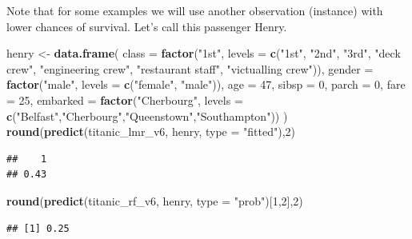 \documentclass[12pt,]{krantz}
\newenvironment{Shaded}{\begin{snugshade}}{\end{snugshade}}
\newcommand{\DataTypeTok}[1]{\textcolor[rgb]{0.13,0.29,0.53}{#1}}
\newcommand{\DecValTok}[1]{\textcolor[rgb]{0.00,0.00,0.81}{#1}}
\newcommand{\KeywordTok}[1]{\textcolor[rgb]{0.13,0.29,0.53}{\textbf{#1}}}
\newcommand{\NormalTok}[1]{#1}
\newcommand{\StringTok}[1]{\textcolor[rgb]{0.31,0.60,0.02}{#1}}
\theoremstyle{definition}
\theoremstyle{definition}
\theoremstyle{definition}
\theoremstyle{remark}
\begin{document}
Note that for some examples we will use another observation (instance)
with lower chances of survival. Let's call this passenger Henry.

\begin{Shaded}
\begin{Highlighting}[]
\NormalTok{henry <-}\StringTok{ }\KeywordTok{data.frame}\NormalTok{(}
            \DataTypeTok{class =} \KeywordTok{factor}\NormalTok{(}\StringTok{"1st"}\NormalTok{, }\DataTypeTok{levels =} \KeywordTok{c}\NormalTok{(}\StringTok{"1st"}\NormalTok{, }\StringTok{"2nd"}\NormalTok{, }\StringTok{"3rd"}\NormalTok{, }\StringTok{"deck crew"}\NormalTok{, }\StringTok{"engineering crew"}\NormalTok{, }\StringTok{"restaurant staff"}\NormalTok{, }\StringTok{"victualling crew"}\NormalTok{)),}
            \DataTypeTok{gender =} \KeywordTok{factor}\NormalTok{(}\StringTok{"male"}\NormalTok{, }\DataTypeTok{levels =} \KeywordTok{c}\NormalTok{(}\StringTok{"female"}\NormalTok{, }\StringTok{"male"}\NormalTok{)),}
            \DataTypeTok{age =} \DecValTok{47}\NormalTok{,}
            \DataTypeTok{sibsp =} \DecValTok{0}\NormalTok{,}
            \DataTypeTok{parch =} \DecValTok{0}\NormalTok{,}
            \DataTypeTok{fare =} \DecValTok{25}\NormalTok{,}
            \DataTypeTok{embarked =} \KeywordTok{factor}\NormalTok{(}\StringTok{"Cherbourg"}\NormalTok{, }\DataTypeTok{levels =} \KeywordTok{c}\NormalTok{(}\StringTok{"Belfast"}\NormalTok{,}\StringTok{"Cherbourg"}\NormalTok{,}\StringTok{"Queenstown"}\NormalTok{,}\StringTok{"Southampton"}\NormalTok{))}
\NormalTok{)}
\KeywordTok{round}\NormalTok{(}\KeywordTok{predict}\NormalTok{(titanic_lmr_v6, henry, }\DataTypeTok{type =} \StringTok{"fitted"}\NormalTok{),}\DecValTok{2}\NormalTok{)}
\end{Highlighting}
\end{Shaded}

\begin{verbatim}
##    1 
## 0.43
\end{verbatim}

\begin{Shaded}
\begin{Highlighting}[]
\KeywordTok{round}\NormalTok{(}\KeywordTok{predict}\NormalTok{(titanic_rf_v6, henry, }\DataTypeTok{type =} \StringTok{"prob"}\NormalTok{)[}\DecValTok{1}\NormalTok{,}\DecValTok{2}\NormalTok{],}\DecValTok{2}\NormalTok{)}
\end{Highlighting}
\end{Shaded}

\begin{verbatim}
## [1] 0.25
\end{verbatim}
\end{document}
